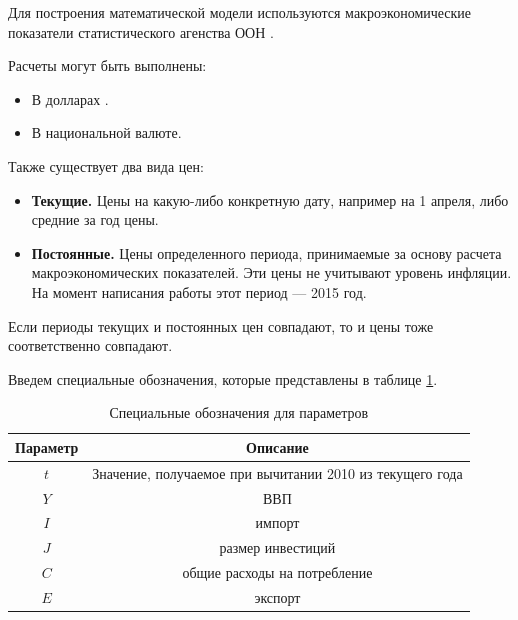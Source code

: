
Для построения математической модели используются макроэкономические показатели статистического агенства ООН \cite{unstat}.

Расчеты могут быть выполнены:
\begin{itemize}
	\item В долларах .
	\item В национальной валюте.
\end{itemize}

Также существует два вида цен:
\begin{itemize}
	\item \textbf{Текущие.}
	Цены на какую-либо конкретную дату, например на 1 апреля, либо средние за год цены.
	\item \textbf{Постоянные.}
	Цены определенного периода, принимаемые за основу расчета макроэкономических показателей.
	Эти цены не учитывают уровень инфляции.
	На момент написания работы этот период --- 2015 год.
\end{itemize}
Если периоды текущих и постоянных цен совпадают, то и цены тоже соответственно совпадают.

Введем специальные обозначения, которые представлены в таблице \ref{desig_of_params}.

\begin{table}[]
	\centering
	\begin{tabular}{|c|c|}
	\hline
	\multicolumn{1}{|c|}{Параметр} & \multicolumn{1}{c|}{Описание} \\ \hline
	$t$                          &Значение, получаемое при вычитании 2010 из текущего года\\
	$Y$                          & ВВП                                                   \\
	$I$                          & импорт                                                \\
	$J$                          & размер инвестиций                                     \\
	$C$                          & общие расходы на потребление                          \\
	$E$                          & экспорт                                               \\ \hline
\end{tabular}
\caption{Специальные обозначения для параметров}\label{desig_of_params}
\end{table}

